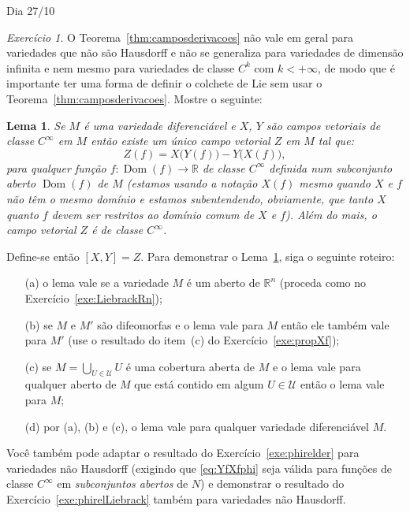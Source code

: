 \documentclass[oneside,11pt]{amsart}
\newcommand{\R}{\mathds R}
\DeclareMathOperator{\Dom}{Dom}
\theoremstyle{remark}\newtheorem{exercise}{Exercício}[section]
\theoremstyle{plain}\newtheorem{teo}{Teorema}[section]
\theoremstyle{plain}\newtheorem{lem}[teo]{Lema}
\theoremstyle{plain}\newtheorem{prop}[teo]{Proposição}
\theoremstyle{definition}\newtheorem{defin}[teo]{Definição}
\theoremstyle{remark}\newtheorem{rem}[teo]{Observação}
\theoremstyle{definition}\newtheorem{example}[teo]{Exemplo}
\numberwithin{equation}{section}
\begin{document}
\begin{section}{Dia 27/10}
\newpage

\noindent{}\hbox{\dbend}\hspace{10pt}\parbox[t]{330pt}{\begin{exercise}
O Teorema~\ref{thm:camposderivacoes} não vale em geral para variedades que não são Hausdorff e não se generaliza para variedades de dimensão infinita e nem mesmo
para variedades de classe $C^k$ com $k<+\infty$, de modo que é importante ter uma forma de definir o colchete de Lie sem usar o Teorema~\ref{thm:camposderivacoes}.
Mostre o seguinte:
\begin{lem}\label{thm:lemLiebrackgeral}
Se $M$ é uma variedade diferenciável e $X$, $Y$ são campos vetoriais de classe $C^\infty$ em $M$ então existe um único campo vetorial
$Z$ em $M$ tal que:
\[Z(f)=X\big(Y(f)\big)-Y\big(X(f)\big),\]
para qualquer função $f:\Dom(f)\to\R$ de classe $C^\infty$ definida num subconjunto aberto $\Dom(f)$ de $M$ (estamos usando a notação $X(f)$ mesmo quando $X$ e $f$
não têm o mesmo domínio e estamos subentendendo, obviamente, que tanto $X$ quanto $f$ devem ser restritos ao domínio comum de $X$ e $f$). Além do mais,
o campo vetorial $Z$ é de classe $C^\infty$.
\end{lem}
Define-se então $[X,Y]=Z$. Para demonstrar o Lema~\ref{thm:lemLiebrackgeral}, siga o seguinte roteiro:
\begin{itemize}
\item[(a)] o lema vale se a variedade $M$ é um aberto de $\R^n$ (proceda como no Exercício~\ref{exe:LiebrackRn});
\item[(b)] se $M$ e $M'$ são difeomorfas e o lema vale para $M$ então ele também vale para $M'$ (use o resultado do item~(c) do Exercício~\ref{exe:propXf});
\item[(c)] se $M=\bigcup_{U\in\mathcal U}U$ é uma cobertura aberta de $M$ e o lema vale para qualquer aberto de $M$ que está contido
em algum $U\in\mathcal U$ então o lema vale para $M$;
\item[(d)] por (a), (b) e (c), o lema vale para qualquer variedade diferenciável $M$.
\end{itemize}
Você também pode adaptar o resultado do Exercício~\ref{exe:phirelder} para variedades não Hausdorff (exigindo que \eqref{eq:YfXfphi} seja válida
para funções de classe $C^\infty$ em {\em subconjuntos abertos\/} de $N$) e demonstrar o resultado do Exercício~\ref{exe:phirelLiebrack} também para variedades
não Hausdorff.
\end{exercise}}

\end{section}
\end{document}
